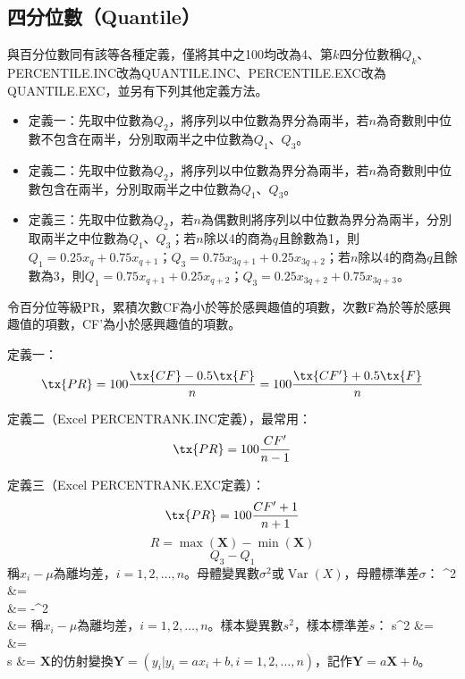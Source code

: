 \documentclass[a4paper,12pt]{report}
\begin{document}
\subsection{四分位數（Quantile）}
與百分位數同有該等各種定義，僅將其中之100均改為4、第$k$四分位數稱$Q_k$、PERCENTILE.INC改為QUANTILE.INC、PERCENTILE.EXC改為QUANTILE.EXC，並另有下列其他定義方法。\\
\begin{itemize}
\item 定義一：先取中位數為$Q_2$，將序列以中位數為界分為兩半，若$n$為奇數則中位數不包含在兩半，分別取兩半之中位數為$Q_1$、$Q_3$。
\item 定義二：先取中位數為$Q_2$，將序列以中位數為界分為兩半，若$n$為奇數則中位數包含在兩半，分別取兩半之中位數為$Q_1$、$Q_3$。
\item 定義三：先取中位數為$Q_2$，若$n$為偶數則將序列以中位數為界分為兩半，分別取兩半之中位數為$Q_1$、$Q_3$；若$n$除以4的商為$q$且餘數為1，則$Q_1=0.25x_q+0.75x_{q+1}$；$Q_3=0.75x_{3q+1}+0.25x_{3q+2}$；若$n$除以4的商為$q$且餘數為3，則$Q_1=0.75x_{q+1}+0.25x_{q+2}$；$Q_3=0.25x_{3q+2}+0.75x_{3q+3}$。
\end{itemize}
令百分位等級PR，累積次數CF為小於等於感興趣值的項數，次數F為於等於感興趣值的項數，CF'為小於感興趣值的項數。
\bit
\item 定義一：
\[\tx{PR}=100\frac{\tx{CF}-0.5\tx{F}}{n}=100\frac{\tx{CF'}+0.5\tx{F}}{n}\]
\item 定義二（Excel PERCENTRANK.INC定義），最常用：
\[\tx{PR} = 100\frac{CF'}{n-1}\]
\item 定義三（Excel PERCENTRANK.EXC定義）：
\[\tx{PR} = 100\frac{CF'+1}{n+1}\]
\eit
{}
\[R=\max(\mathbf{X})-\min(\mathbf{X})\]
\[Q_3-Q_1\]
稱$x_i-\mu$為離均差，$i=1,2,\ldots,n$。母體變異數$\sigma^2$或$\operatorname{Var}(X)$，母體標準差$\sigma$：
\bma
\sigma^2 &= \\
&= -\mu^2\\
\sigma &= 
\eam
{}
稱$x_i-\mu$為離均差，$i=1,2,\ldots,n$。樣本變異數$s^2$，樣本標準差$s$：
\bma
s^2 &= \\
&= \\
s &= 
\eam
{}
$\mathbf{X}$的仿射變換$\mathbf{Y}=(y_i| y_i=ax_i+b,i=1,2,\ldots,n)$，記作$\mathbf{Y}=a\mathbf{X}+b$。
\end{document}
